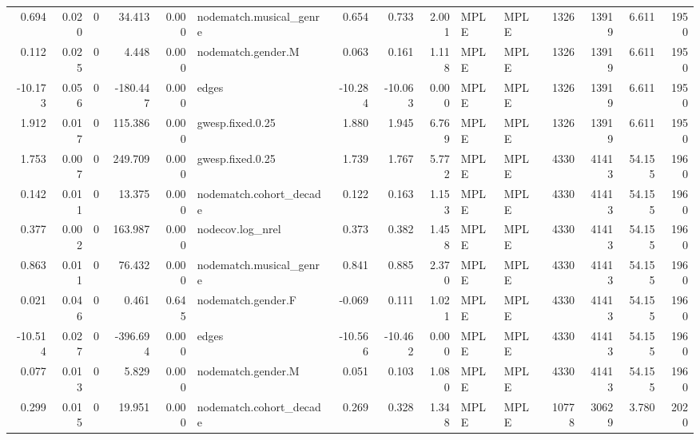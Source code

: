 \begin{table}
\begin{tabular}{rrrrrlrrrllrrrr}
    0.694 & 0.020 &        0 &   34.413 &     0.000 & nodematch.musical\_genre &   0.654 &   0.733 &  2.001 &         MPLE &   MPLE &    1326 &    13919 &     6.611 &      1950 \\
    0.112 & 0.025 &        0 &    4.448 &     0.000 &      nodematch.gender.M &   0.063 &   0.161 &  1.118 &         MPLE &   MPLE &    1326 &    13919 &     6.611 &      1950 \\
  -10.173 & 0.056 &        0 & -180.447 &     0.000 &                   edges & -10.284 & -10.063 &  0.000 &         MPLE &   MPLE &    1326 &    13919 &     6.611 &      1950 \\
    1.912 & 0.017 &        0 &  115.386 &     0.000 &        gwesp.fixed.0.25 &   1.880 &   1.945 &  6.769 &         MPLE &   MPLE &    1326 &    13919 &     6.611 &      1950 \\
    1.753 & 0.007 &        0 &  249.709 &     0.000 &        gwesp.fixed.0.25 &   1.739 &   1.767 &  5.772 &         MPLE &   MPLE &    4330 &    41413 &    54.155 &      1960 \\
    0.142 & 0.011 &        0 &   13.375 &     0.000 & nodematch.cohort\_decade &   0.122 &   0.163 &  1.153 &         MPLE &   MPLE &    4330 &    41413 &    54.155 &      1960 \\
    0.377 & 0.002 &        0 &  163.987 &     0.000 &        nodecov.log\_nrel &   0.373 &   0.382 &  1.458 &         MPLE &   MPLE &    4330 &    41413 &    54.155 &      1960 \\
    0.863 & 0.011 &        0 &   76.432 &     0.000 & nodematch.musical\_genre &   0.841 &   0.885 &  2.370 &         MPLE &   MPLE &    4330 &    41413 &    54.155 &      1960 \\
    0.021 & 0.046 &        0 &    0.461 &     0.645 &      nodematch.gender.F &  -0.069 &   0.111 &  1.021 &         MPLE &   MPLE &    4330 &    41413 &    54.155 &      1960 \\
  -10.514 & 0.027 &        0 & -396.694 &     0.000 &                   edges & -10.566 & -10.462 &  0.000 &         MPLE &   MPLE &    4330 &    41413 &    54.155 &      1960 \\
    0.077 & 0.013 &        0 &    5.829 &     0.000 &      nodematch.gender.M &   0.051 &   0.103 &  1.080 &         MPLE &   MPLE &    4330 &    41413 &    54.155 &      1960 \\
    0.299 & 0.015 &        0 &   19.951 &     0.000 & nodematch.cohort\_decade &   0.269 &   0.328 &  1.348 &         MPLE &   MPLE &   10778 &    30629 &     3.780 &      2020 \\

\end{tabular}
\end{table}
